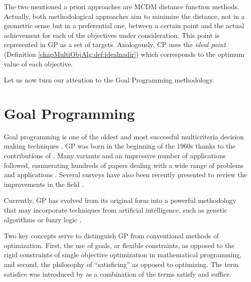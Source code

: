 The two mentioned a priori approaches are MCDM distance function methods. Actually, both methodological approaches aim to minimize the distance, not in a geometric sense but in a preferential one, between a certain point and the actual achievement for each of the objectives under consideration. This point is represented in GP as a set of targets. Analogously, CP uses the \emph{ideal point} (Definition \ref{chapMultiObjAlg:def:idealnadir}) which corresponds to the optimum value of each objective. 

Let us now turn our attention to the Goal Programming methodology.

\section{Goal Programming}
\label{chapMultiObjAlg:sec:GP}

Goal programming is one of the oldest and most successful multicriteria decision making techniques \citep{ChankongHaimes1983}. GP was born in the beginning of the 1960s thanks to the contributions of \cite{Charnes1961}. Many variants and an impressive number of applications followed, enumerating hundreds of papers dealing with a wide range of problems and applications \citep{Ignizio1976, Ignizio1978, Ignizio1984, Charnes1977, Zeleny1981, Zeleny1982, Zeleny1984, Zanakis1985, Romero1986, Romero1991, Schniederjans1995, Tamiz1998, Aouni2001}. Several surveys have also been recently presented to review the improvements in the field \citep{Caballero2010,Orumie2014, Aouni2014}. 

Currently, GP has evolved from its original form into a powerful methodology that may incorporate techniques from artificial intelligence, such as genetic algorithms \citep{Pal2012, Deb1999} or fuzzy logic \citep{Bankian-Tabrizi2012, Shahnazari-Shahrezaei2013, Sen2013, DaSilva2014}. 

Two key concepts serve to distinguish GP from conventional methods of optimization. First, the use of goals, or flexible constraints, as opposed to the rigid constraints of single objective optimization in mathematical programming, and second, the philosophy of ``satisficing'' as opposed to optimizing. The term satisfice was introduced by \citet{simon1956} as a combination of the terms satisfy and suffice. 

